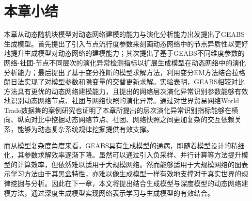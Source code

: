 \section{本章小结\label{chap4:summary}}

本章从动态随机块模型对动态网络建模的能力与演化分析能力出发提出了GEABS生成模型。首先提出了引入节点流行度参数来刻画动态网络中的节点异质性以更好地提升生成模型对动态网络的建模能力；其次提出了基于GEABS不同维度参数的网络-社团-节点不同层次的演化异常检测指标以扩展生成模型在动态网络中的演化分析能力；最后提出了基于变分推断的模型求解方法，利用变分EM方法结合拉格朗日法实现了对模型参数和隐变量的交替更新求解。实验表明，GEABS相较对比方法具有更优的动态网络建模能力，且提出的网络层次演化异常识别参数能够有效地识别动态网络节点、社团与网络快照的演化异常。通过对世界贸易网络World Trade数据集的案例研究也证明了本章所提出的层次演化异常识别指标能够在横向、纵向对比中挖掘动态网络节点、社团、网络快照之间更加复杂的交互依赖关系，能够为动态复杂系统规律挖掘提供有效支撑。

而从模型复杂度角度来看，GEABS具有生成模型的通病，即随着模型设计的精细化，其参数求解效率逐渐下降。虽然可以通过引入负采样、并行计算等方法提升模型的计算效率，但依然难以适用于大规模网络。然而能够适用于大规模网络的图表示学习方法由于其黑盒特性，亦难以像生成模型一样有效地支撑对于真实世界的规律挖掘与分析。因此在下一章，本文将提出结合生成模型与深度模型的动态网络建模方法，通过深度生成模型实现网络表示学习与生成模型的有效结合。